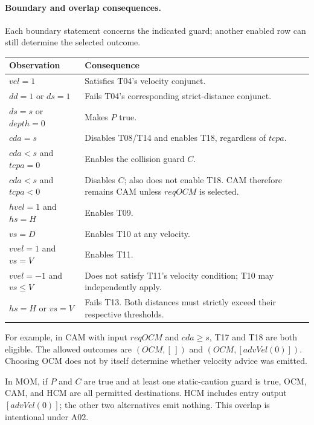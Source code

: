 \documentclass[10pt,a4paper]{article}
\begin{document}
\paragraph{Boundary and overlap consequences.} Each boundary statement concerns the indicated guard; another enabled row can still determine the selected outcome.

\begin{longtable}{@{}L{0.18\textwidth}L{0.74\textwidth}@{}}
\toprule
\textbf{Observation} & \textbf{Consequence} \\
\midrule
\endhead

$\mathit{vel} = 1$ & Satisfies T04's velocity conjunct. \\
$\mathit{dd} = 1$ or $\mathit{ds} = 1$ & Fails T04's corresponding strict-distance conjunct. \\
$\mathit{ds} = \mathit{s}$ or $\mathit{depth} = 0$ & Makes $\mathit{P}$ true. \\
$\mathit{cda} = \mathit{s}$ & Disables T08/T14 and enables T18, regardless of $\mathit{tcpa}$. \\
$\mathit{cda} < \mathit{s}$ and $\mathit{tcpa} = 0$ & Enables the collision guard $\mathit{C}$. \\
$\mathit{cda} < \mathit{s}$ and $\mathit{tcpa} < 0$ & Disables $\mathit{C}$; also does not enable T18. CAM therefore remains CAM unless $\mathit{reqOCM}$ is selected. \\
$\mathit{hvel} = 1$ and $\mathit{hs} = \mathit{H}$ & Enables T09. \\
$\mathit{vs} = \mathit{D}$ & Enables T10 at any velocity. \\
$\mathit{vvel} = 1$ and $\mathit{vs} = \mathit{V}$ & Enables T11. \\
$\mathit{vvel} = -1$ and $\mathit{vs} \le  \mathit{V}$ & Does not satisfy T11's velocity condition; T10 may independently apply. \\
$\mathit{hs} = \mathit{H}$ or $\mathit{vs} = \mathit{V}$ & Fails T13. Both distances must strictly exceed their respective thresholds. \\
\bottomrule
\end{longtable}

For example, in CAM with input $\mathit{reqOCM}$ and $\mathit{cda} \ge  \mathit{s}$, T17 and T18 are both eligible. The allowed outcomes are $(\mathit{OCM}, [\,])$ and $(\mathit{OCM}, [\mathit{advVel}(0)])$. Choosing OCM does not by itself determine whether velocity advice was emitted.

In MOM, if $\mathit{P}$ and $\mathit{C}$ are true and at least one static-caution guard is true, OCM, CAM, and HCM are all permitted destinations. HCM includes entry output $[\mathit{advVel}(0)]$; the other two alternatives emit nothing. This overlap is intentional under A02.
\end{document}
